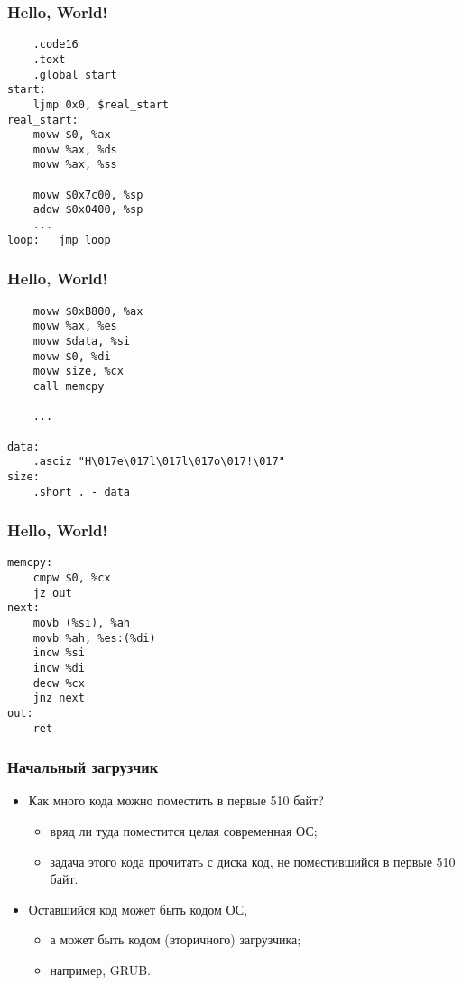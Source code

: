 \begin{frame}[fragile]
\frametitle{Hello, World!}
\begin{lstlisting}
	.code16
	.text
	.global start
start:
	ljmp 0x0, $real_start
real_start:
	movw $0, %ax
	movw %ax, %ds
	movw %ax, %ss

	movw $0x7c00, %sp
	addw $0x0400, %sp
	...
loop:	jmp loop
\end{lstlisting}
\end{frame}

\begin{frame}[fragile]
\frametitle{Hello, World!}
\begin{lstlisting}
	movw $0xB800, %ax
	movw %ax, %es
	movw $data, %si
	movw $0, %di
	movw size, %cx
	call memcpy

	...

data:
	.asciz "H\017e\017l\017l\017o\017!\017"
size:
	.short . - data
\end{lstlisting}
\end{frame}

\begin{frame}[fragile]
\frametitle{Hello, World!}
\begin{lstlisting}
memcpy:
	cmpw $0, %cx
	jz out
next:
	movb (%si), %ah
	movb %ah, %es:(%di)
	incw %si
	incw %di
	decw %cx
	jnz next
out:
	ret
\end{lstlisting}
\end{frame}

\begin{frame}
\frametitle{Начальный загрузчик}
\begin{itemize}
    \item<1->Как много кода можно поместить в первые 510 байт?
    \begin{itemize}
        \item<1-> вряд ли туда поместится целая современная ОС;
        \item<2-> задача этого кода прочитать с диска код, не
        поместившийся в первые 510 байт.
    \end{itemize}
    \item<3->Оставшийся код может быть кодом ОС,
    \begin{itemize}
        \item<3->а может быть кодом (вторичного) загрузчика;
        \item<4->например, GRUB.
    \end{itemize}
\end{itemize}
\end{frame}
